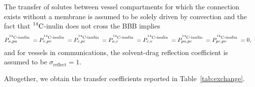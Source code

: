 \documentclass[10pt]{article}
\newcommand{\1}{^{(1)}}
\newcommand{\2}{^{(2)}}
\newcommand{\Cinulin}{$\prescript{14}{}{\text{C}}$-inulin }
\providecommand{\DIFdelbeginFL}{} %
\newcommand{\DIFscaledelfig}{0.5}
\newlength{\DIFdelgraphicswidth} %
\newlength{\DIFdelgraphicsheight} %
\newcommand{\DIFdelincludegraphics}[2][]{%
\sbox{\DIFdelgraphicsbox}{\DIFOincludegraphics[#1]{#2}}%
\settoboxwidth{\DIFdelgraphicswidth}{\DIFdelgraphicsbox} %
\settoboxtotalheight{\DIFdelgraphicsheight}{\DIFdelgraphicsbox} %
\scalebox{\DIFscaledelfig}{%
\parbox[b]{\DIFdelgraphicswidth}{\usebox{\DIFdelgraphicsbox}\\[-\baselineskip] \rule{\DIFdelgraphicswidth}{0em}}\llap{\resizebox{\DIFdelgraphicswidth}{\DIFdelgraphicsheight}{%
\setlength{\unitlength}{\DIFdelgraphicswidth}%
\begin{picture}(1,1)%
\thicklines\linethickness{2pt} %
{\color[rgb]{1,0,0}\put(0,0){\framebox(1,1){}}}%
{\color[rgb]{1,0,0}\put(0,0){\line( 1,1){1}}}%
{\color[rgb]{1,0,0}\put(0,1){\line(1,-1){1}}}%
\end{picture}%
}\hspace*{3pt}}} %
} %
\DeclareRobustCommand{\DIFdelbeginFL}{\DIFOdelbeginFL \let\includegraphics\DIFdelincludegraphics} %
\begin{document}
The transfer of solutes between vessel compartments for which the connection exists without a membrane is assumed to be solely driven by convection and the fact that \Cinulin does not cross the BBB implies
\[
    P_{a,pa}^\text{\Cinulin} = P_{v,pv}^\text{\Cinulin} = P_{c,pc}^\text{\Cinulin}= P_{a,c}^\text{\Cinulin}=P_{c,v}^\text{\Cinulin}=P_{pa, pc}^\text{\Cinulin} = P_{pc, pv}^\text{\Cinulin} = 0, 
\]
and for vessels in communications, the solvent-drag reflection coefficient is assumed to be $\sigma_\text{reflect}=1$.

Altogether, we obtain the transfer coefficients reported in Table~\ref{tab:exchange}. 
\begin{table}[h]
    \centering
    \DIFdelbeginFL %

\end{table}
\end{document}

